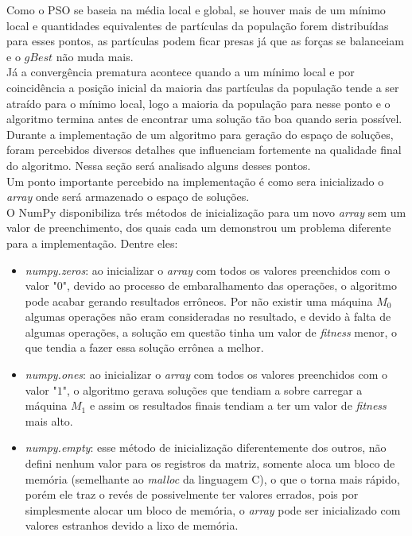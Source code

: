 Como o PSO se baseia na média local e global, se houver mais de um mínimo local e quantidades equivalentes de partículas da população forem distribuídas para esses pontos, as partículas podem ficar presas já que as forças se balanceiam e o $gBest$ não muda mais.\\
%
\indent Já a convergência prematura acontece quando a um mínimo local e por coincidência a posição inicial da maioria das partículas da população tende a ser atraído para o mínimo local, logo a maioria da população para nesse ponto e o algoritmo termina antes de encontrar uma solução tão boa quando seria possível.\\
\indent Durante a implementação de um algoritmo para geração do espaço de soluções, foram percebidos diversos detalhes que influenciam fortemente na qualidade final do algoritmo. Nessa seção será analisado alguns desses pontos.\\
\indent Um ponto importante percebido na implementação é como sera inicializado o \textit{array} onde será armazenado o espaço de soluções.\\
\indent O NumPy disponibiliza trés métodos de inicialização para um novo \textit{array} sem um valor de preenchimento, dos quais cada um demonstrou um problema diferente para a implementação. Dentre eles: 
\begin{itemize}
    \item \textit{numpy.zeros}: ao inicializar o \textit{array} com todos os valores preenchidos com o valor "$0$", devido ao processo de embaralhamento das operações, o algoritmo pode acabar gerando resultados errôneos. Por não existir uma máquina $M_0$ algumas operações não eram consideradas no resultado, e devido à falta de algumas operações, a solução em questão tinha um valor de \textit{fitness} menor, o que tendia a fazer essa solução errônea a melhor.

    \item \textit{numpy.ones}: ao inicializar o \textit{array} com todos os valores preenchidos com o valor "$1$", o algoritmo gerava soluções que tendiam a sobre carregar a máquina $M_1$ e assim os resultados finais tendiam a ter um valor de \textit{fitness} mais alto.

    \item \textit{numpy.empty}: esse método de inicialização diferentemente dos outros, não defini nenhum valor para os registros da matriz, somente aloca um bloco de memória (semelhante ao \textit{malloc} da linguagem C), o que o torna mais rápido, porém ele traz o revés de possivelmente ter valores errados, pois por simplesmente alocar um bloco de memória, o \textit{array} pode ser inicializado com valores estranhos devido a lixo de memória.
\end{itemize}

